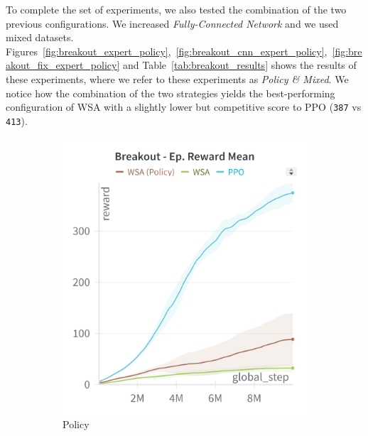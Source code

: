 To complete the set of experiments, we also tested the combination of the two previous configurations.
We increased \textit{Fully-Connected Network} and we used mixed datasets.
Figures~\ref{fig:breakout_expert_policy},~\ref{fig:breakout_cnn_expert_policy},~\ref{fig:breakout_fix_expert_policy} and Table~\ref{tab:breakout_results} shows the results of these experiments, where we refer to these experiments as \textit{Policy \& Mixed}.
We notice how the combination of the two strategies yields the best-performing configuration of WSA with a slightly lower but competitive score to PPO (\texttt{387} vs \texttt{413}).


\begin{figure}[ht]
    \centering
    \begin{subfigure}[b]{0.32\textwidth}
        \centering
        \includegraphics[width=\textwidth]{images/breakout_policy}
        \caption{Policy}
        \label{fig:breakout_policy}
    \end{subfigure}
    \hfill
    \begin{subfigure}[b]{0.32\textwidth}
        \centering

\end{subfigure}
\end{figure}
